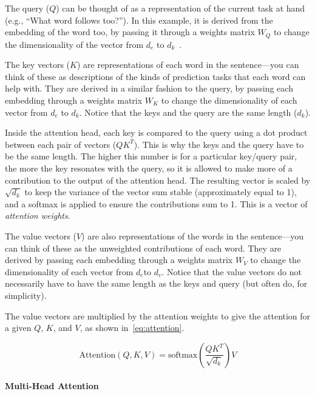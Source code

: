 The query (\(Q\)) can be thought of as a representation of the current task at hand (e.g., ``What word follows too?'').
In this example, it is derived from the embedding of the word too, by passing it through a weights matrix \( W_Q \) to change the dimensionality of the vector from \( d_e \) to \( d_k \)~.

The key vectors (\( K \)) are representations of each word in the sentence—you can think of these as descriptions of the kinds of prediction tasks that each word can help with.
They are derived in a similar fashion to the query, by passing each embedding through a weights matrix \( W_K \) to change the dimensionality of each vector from \( d_e \) to \( d_k \).
Notice that the keys and the query are the same length (\( d_k \)).


Inside the attention head, each key is compared to the query using a dot product between each pair of vectors (\( QK^{T} \)).
This is why the keys and the query have to be the same length.
The higher this number is for a particular key/query pair, the more the key resonates with the query, so it is allowed to make more of a contribution to the output of the attention head.
The resulting vector is scaled by  \( \sqrt{d_k} \) to keep the variance of the vector sum stable (approximately equal to 1), and a softmax is applied to ensure the contributions sum to 1.
This is a vector of \emph{attention weights}.

The value vectors (\( V \)) are also representations of the words in the sentence—you can think of these as the unweighted contributions of each word.
They are derived by passing each embedding through a weights matrix \( W_V \) to change the dimensionality of each vector from  \( d_e \)to \( d_v \).
Notice that the value vectors do not necessarily have to have the same length as the keys and query (but often do, for simplicity).

The value vectors are multiplied by the attention weights to give the attention for a given \( Q \), \( K \), and \( V \), as shown in~\autoref{eq:attention}.

\begin{equation}
	\mathrm{Attention}(Q, K, V) = \mathrm{softmax}\left(\frac{QK^{T}}{\sqrt{d_k}}\right)V
	\label{eq:attention}
\end{equation}

\paragraph{Multi-Head Attention}

